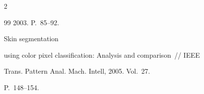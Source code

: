 \begin{multicols}{2}
{{\begin{thebibliography}{99}
  2003. P.~85--92.


  


  \label{end\stat}







 Skin segmentation


  using color pixel classification: Analysis and comparison~// IEEE


  Trans. Pattern Anal. Mach. Intell, 2005. Vol.~27.


P.~148--154.


 \end{thebibliography}


}


}








\end{multicols}


